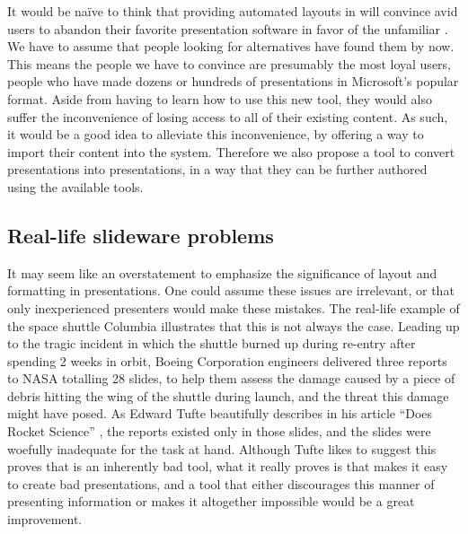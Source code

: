    It would be na\"ive to think that providing automated layouts in \mxp will
   convince avid \ppt users to abandon their favorite presentation software in
   favor of the unfamiliar \mxp. We have to assume that people looking for
   alternatives have found them by now. This means the people we have to
   convince are presumably the most loyal \ppt users, people who have made
   dozens or hundreds of presentations in Microsoft's popular format. Aside
   from having to learn how to use this new tool, they would also suffer the
   inconvenience of losing access to all of their existing content. As such, it
   would be a good idea to alleviate this inconvenience, by offering a way to
   import their content into the \mxp system. Therefore we also propose a tool
   to convert \ppt presentations into \mxp presentations, in a way that they
   can be further authored using the available \mxp tools.

   \subsection{Real-life slideware problems}
    \label{nasa}

    It may seem like an overstatement to emphasize the significance of layout
    and formatting in presentations. One could assume these issues are
    irrelevant, or that only inexperienced presenters would make these mistakes.
    The real-life example of the space shuttle Columbia illustrates that this is
    not always the case. Leading up to the tragic incident in which the shuttle
    burned up during re-entry after spending 2 weeks in orbit, Boeing
    Corporation engineers delivered three reports to {NASA} totalling 28 \ppt
    slides, to help them assess the damage caused by a piece of debris hitting
    the wing of the shuttle during launch, and the threat this damage might have
    posed.  As Edward Tufte beautifully describes in his article ``\ppt Does
    Rocket Science'' \citep{tufte-2}, the reports existed only in those slides,
    and the slides were woefully inadequate for the task at hand. Although Tufte
    likes to suggest this proves that \ppt is an inherently bad tool, what it
    really proves is that \ppt makes it easy to create bad presentations, and a
    tool that either discourages this manner of presenting information or makes
    it altogether impossible would be a great improvement.

